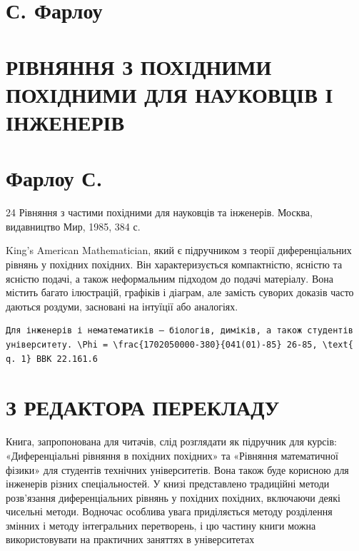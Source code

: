 \documentclass[
  ukrainian,
]{article}
\author{}
\date{}
\begin{document}
\section{С. Фарлоу}\label{ux441.-ux444ux430ux440ux43bux43eux443}

\section{РІВНЯННЯ З ПОХІДНИМИ ПОХІДНИМИ ДЛЯ НАУКОВЦІВ І
ІНЖЕНЕРІВ}\label{ux440ux456ux432ux43dux44fux43dux43dux44f-ux437-ux43fux43eux445ux456ux434ux43dux438ux43cux438-ux43fux43eux445ux456ux434ux43dux438ux43cux438-ux434ux43bux44f-ux43dux430ux443ux43aux43eux432ux446ux456ux432-ux456-ux456ux43dux436ux435ux43dux435ux440ux456ux432}

\section{Фарлоу С.}\label{ux444ux430ux440ux43bux43eux443-ux441.}

24 Рівняння з частими похідними для науковців та інженерів. Москва,
видавництво Мир, 1985, 384 с.

King's American Mathematician, який є підручником з теорії
диференціальних рівнянь у похідних похідних. Він характеризується
компактністю, ясністю та ясністю подачі, а також неформальним підходом
до подачі матеріалу. Вона містить багато ілюстрацій, графіків і діаграм,
але замість суворих доказів часто даються роздуми, засновані на інтуїції
або аналогіях.

\begin{verbatim}
Для інженерів і нематематиків — біологів, диміків, а також студентів університету. \Phi = \frac{1702050000-380}{041(01)-85} 26-85, \text{ q. 1} BBK 22.161.6
\end{verbatim}

\section{З РЕДАКТОРА
ПЕРЕКЛАДУ}\label{ux437-ux440ux435ux434ux430ux43aux442ux43eux440ux430-ux43fux435ux440ux435ux43aux43bux430ux434ux443}

Книга, запропонована для читачів, слід розглядати як підручник для
курсів: «Диференціальні рівняння в похідних похідних» та «Рівняння
математичної фізики» для студентів технічних університетів. Вона також
буде корисною для інженерів різних спеціальностей. У книзі представлено
традиційні методи розв'язання диференціальних рівнянь у похідних
похідних, включаючи деякі чисельні методи. Водночас особлива увага
приділяється методу розділення змінних і методу інтегральних
перетворень, і цю частину книги можна використовувати на практичних
заняттях в університетах
\end{document}
